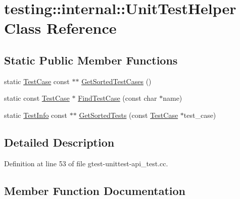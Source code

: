 \hypertarget{classtesting_1_1internal_1_1_unit_test_helper}{}\section{testing\+:\+:internal\+:\+:Unit\+Test\+Helper Class Reference}
\label{classtesting_1_1internal_1_1_unit_test_helper}
\subsection*{Static Public Member Functions}
\begin{DoxyCompactItemize}
\item 
static \hyperlink{classtesting_1_1_test_case}{Test\+Case} const $\ast$$\ast$ \hyperlink{classtesting_1_1internal_1_1_unit_test_helper_a9a549307062083d10358638af272cc98}{Get\+Sorted\+Test\+Cases} ()
\item 
static const \hyperlink{classtesting_1_1_test_case}{Test\+Case} $\ast$ \hyperlink{classtesting_1_1internal_1_1_unit_test_helper_a46303cbb7a6abb456f7b1350542113ac}{Find\+Test\+Case} (const char $\ast$name)
\item 
static \hyperlink{classtesting_1_1_test_info}{Test\+Info} const $\ast$$\ast$ \hyperlink{classtesting_1_1internal_1_1_unit_test_helper_a02602d22fb74566dad78c0c9d4f24e78}{Get\+Sorted\+Tests} (const \hyperlink{classtesting_1_1_test_case}{Test\+Case} $\ast$test\+\_\+case)
\end{DoxyCompactItemize}


\subsection{Detailed Description}


Definition at line 53 of file gtest-\/unittest-\/api\+\_\+test.\+cc.



\subsection{Member Function Documentation}
